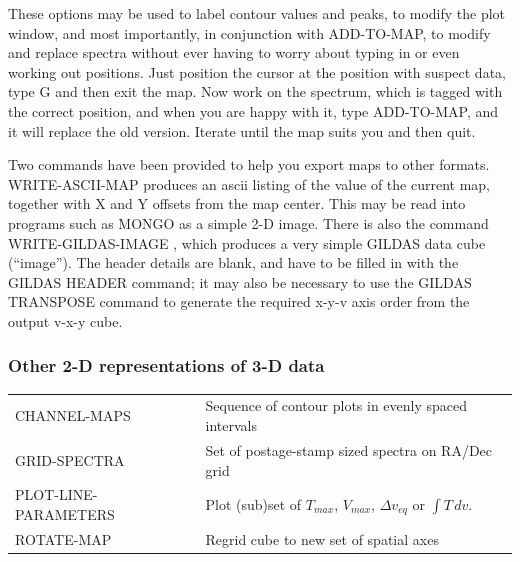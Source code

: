 \documentclass[11pt,twoside]{report}
\begin{document}
These options may be used to label contour values and peaks, to modify the
plot window, and most importantly, in conjunction with ADD-TO-MAP, to modify
and replace spectra without ever having to worry about typing in or even
working out positions.  Just position the cursor
at the position with suspect data, type G and then exit the map. Now work on
the spectrum, which is tagged with the correct position, and when you are happy
with it, type ADD-TO-MAP, and it will replace the old version. Iterate until
the map suits you and then quit.

Two commands have been provided to help you export maps to other formats.
WRITE-ASCII-MAP produces an ascii listing of the
value of the current map, together with X and Y offsets from the map center.
This may be read into programs such as MONGO
as a simple 2-D image. There
is also the command WRITE-GILDAS-IMAGE
,
which produces a very simple
GILDAS data cube (``image''). The header details are blank, and have to be
filled in with the GILDAS HEADER command; it may also be necessary to
use the GILDAS TRANSPOSE command to generate the required x-y-v axis
order from the output v-x-y cube.


\subsubsection{Other 2-D representations of 3-D data}

\begin{tabular}{ll}
CHANNEL-MAPS            & Sequence of contour plots in evenly spaced intervals\\
GRID-SPECTRA            & Set of postage-stamp sized spectra on RA/Dec grid\\
PLOT-LINE-PARAMETERS    & Plot (sub)set of $T_{max}$, $V_{max}$,
                          $\Delta v_{eq}$ or $\int T\,dv$.\\
ROTATE-MAP              & Regrid cube to new set of spatial axes\\
\end{tabular}
\end{document}
